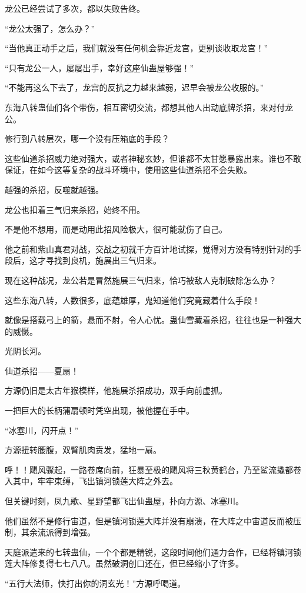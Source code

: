 \begin{this_body}
龙公已经尝试了多次，都以失败告终。

“龙公太强了，怎么办？”

“当他真正动手之后，我们就没有任何机会靠近龙宫，更别谈收取龙宫！”

“只有龙公一人，屡屡出手，幸好这座仙蛊屋够强！”

“不能再这么下去了，龙宫的反抗之力越来越弱，迟早会被龙公收服的。”

东海八转蛊仙们各个带伤，相互密切交流，都想其他人出动底牌杀招，来对付龙公。

修行到八转层次，哪一个没有压箱底的手段？

这些仙道杀招威力绝对强大，或者神秘玄妙，但谁都不太甘愿暴露出来。谁也不敢保证，在如今这等复杂的战斗环境中，使用这些仙道杀招不会失败。

越强的杀招，反噬就越强。

龙公也扣着三气归来杀招，始终不用。

不是他不想用，而是动用此招风险极大，很可能就伤了自己。

他之前和紫山真君对战，交战之初就千方百计地试探，觉得对方没有特别针对的手段后，这才寻找到良机，施展出三气归来。

现在这种战况，龙公若是冒然施展三气归来，恰巧被敌人克制破除怎么办？

这些东海八转，人数很多，底蕴雄厚，鬼知道他们究竟藏着什么手段！

就像是搭载弓上的箭，悬而不射，令人心忧。蛊仙雪藏着杀招，往往也是一种强大的威慑。

光阴长河。

仙道杀招——夏扇！

方源仍旧是太古年猴模样，他施展杀招成功，双手向前虚抓。

一把巨大的长柄蒲扇顿时凭空出现，被他握在手中。

“冰塞川，闪开点！”

方源扭转腰腹，双臂肌肉贲发，猛地一扇。

呼！！飓风骤起，一路卷席向前，狂暴至极的飓风将三秋黄鹤台，乃至鲨流撬都卷入其中，牢牢束缚，飞出镇河锁莲大阵之外去。

但关键时刻，凤九歌、星野望都飞出仙蛊屋，扑向方源、冰塞川。

他们虽然不是修行宙道，但是镇河锁莲大阵并没有崩溃，在大阵之中宙道反而被压制，其余流派得到增强。

天庭派遣来的七转蛊仙，一个个都是精锐，这段时间他们通力合作，已经将镇河锁莲大阵修复得七七八八。虽然破洞创口还在，但已经缩小了许多。

“五行大法师，快打出你的洞玄光！”方源呼喝道。


\end{this_body}
